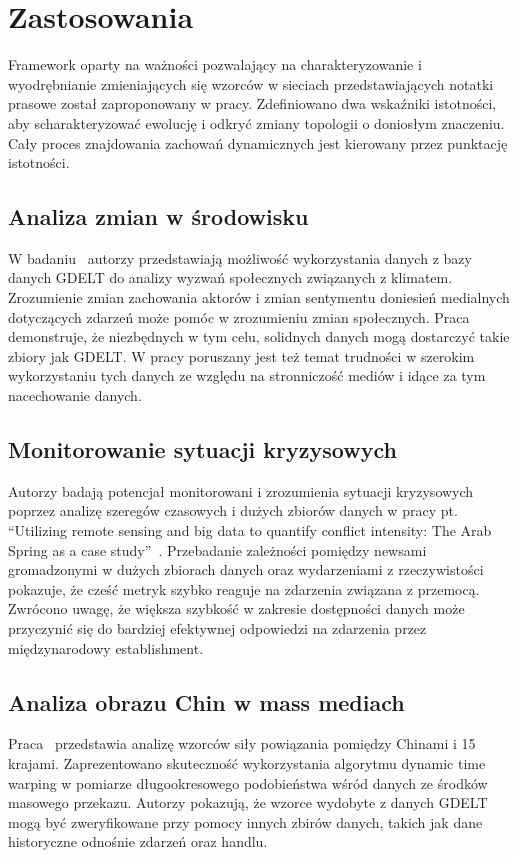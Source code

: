 \documentclass[11pt]{report}
\begin{document}
    \section{Zastosowania}\label{sec:zastosowania}
    Framework oparty na ważności pozwalający na charakteryzowanie
    i wyodrębnianie zmieniających się wzorców w sieciach przedstawiających notatki prasowe został zaproponowany
    w pracy\cite{Yan2012}.
    Zdefiniowano dwa wskaźniki istotności, aby scharakteryzować ewolucję i odkryć zmiany topologii o doniosłym znaczeniu.
    Cały proces znajdowania zachowań dynamicznych jest kierowany przez punktację istotności.

    \subsection{Analiza zmian w środowisku}
    W badaniu~\cite{Buckingham2020} autorzy przedstawiają możliwość wykorzystania danych z bazy danych GDELT
    do analizy wyzwań społecznych związanych z klimatem.
    Zrozumienie zmian zachowania aktorów i zmian sentymentu doniesień medialnych dotyczących zdarzeń może pomóc w zrozumieniu zmian społecznych.
    Praca demonstruje, że niezbędnych w tym celu, solidnych danych mogą dostarczyć takie zbiory jak GDELT\@.
    W pracy poruszany jest też temat trudności w szerokim wykorzystaniu tych danych ze względu na stronniczość mediów
    i idące za tym nacechowanie danych.

    \subsection{Monitorowanie sytuacji kryzysowych}
    Autorzy badają potencjał monitorowani i zrozumienia sytuacji kryzysowych poprzez analizę szeregów czasowych i dużych zbiorów danych
    w pracy pt. ``Utilizing remote sensing and big data to quantify conflict intensity: The Arab Spring as a case study''~\cite{Levin2018}.
    Przebadanie zależności pomiędzy newsami gromadzonymi w dużych zbiorach danych oraz wydarzeniami z rzeczywistości pokazuje,
    że cześć metryk szybko reaguje na zdarzenia związana z przemocą.
    Zwrócono uwagę, że większa szybkość w zakresie dostępności danych może przyczynić się do bardziej efektywnej
    odpowiedzi na zdarzenia przez międzynarodowy establishment.

    \subsection{Analiza obrazu Chin w mass mediach}
    Praca~\cite{Yuan2017} przedstawia analizę wzorców siły powiązania pomiędzy Chinami i 15 krajami.
    Zaprezentowano skuteczność wykorzystania algorytmu dynamic time warping w pomiarze długookresowego podobieństwa
    wśród danych ze środków masowego przekazu.
    Autorzy pokazują, że wzorce wydobyte z danych GDELT mogą być zweryfikowane przy pomocy innych zbirów danych,
    takich jak dane historyczne odnośnie zdarzeń oraz handlu.
\end{document}
